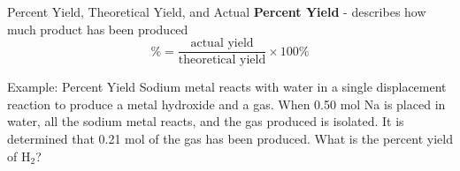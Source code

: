 \documentclass[11pt]{beamer}
\begin{document}
\begin{frame}{Percent Yield, Theoretical Yield, and Actual}
  \textbf{Percent Yield} - describes how much product has been
  produced
  \begin{equation}
    \% = \frac{\text{actual yield}}{\text{theoretical yield}} \times 100\%
  \end{equation}
  
\end{frame}

\begin{frame}{Example: Percent Yield}
  Sodium metal reacts with water in a single displacement reaction to produce
  a metal hydroxide and a gas. When 0.50 mol Na is placed in water, all the sodium
  metal reacts, and the gas produced is isolated. It is determined that 0.21 mol of the gas
  has been produced. What is the percent yield of H$_2$?

  \vfill
\end{frame}
\end{document}
